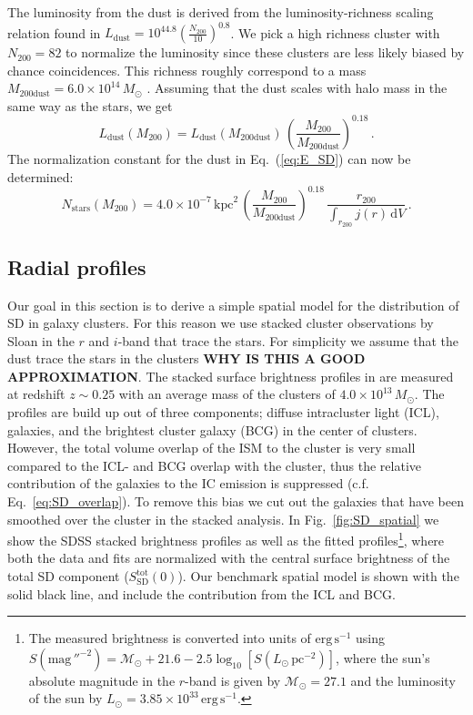 \documentclass[10pt,aps,pra,reprint,amsmath,amsfonts,amssymb,showpacs,nofootinbib,floatfix]{revtex4-1}
\newcommand{\rmn}{\mathrm}
\newcommand{\sd}{\rmn{SD}}
\newcommand{\msun}{M_\odot}
\newcommand{\stars}{\rmn{stars}}
\newcommand{\dust}{\rmn{dust}}
\newcommand{\kpc}{\rmn{kpc}}
\newcommand{\dd}{\rmn{d}}
\newcommand{\rvir}{r_{200}}
\newcommand{\mvir}{M_{200}}
\begin{document}
The luminosity from the dust is derived from the luminosity-richness
scaling relation found in \cite{2008A&A...490..547G}
$L_\dust=10^{44.8}\left(\frac{N_{200}}{10}\right)^{0.8}$. We pick a
high richness cluster with $N_{200}=82$ to normalize the luminosity
since these clusters are less likely biased by chance
coincidences. This richness roughly correspond to a mass
$M_\rmn{200dust}=6.0\times10^{14}\,\msun$
\cite{2010ApJ...713.1037H}. Assuming that the dust scales with halo
mass in the same way as the stars, we get
\begin{equation}
L_\dust(\mvir)=L_\dust(M_\rmn{200dust})\,
\left(\frac{\mvir}{M_\rmn{200dust}}\right)^{0.18}\,.
\label{eq:L_dust_scale}
\end{equation} 
The normalization constant for the dust in Eq.~(\ref{eq:E_SD}) can now
be determined:
\begin{equation}
 N_\stars(\mvir) = 4.0\times10^{-7}\,\kpc^2\,
\left(\frac{\mvir}{M_\rmn{200dust}}\right)^{0.18}\,
\frac{\rvir}{\int_{\rvir} j(r) \,\dd V}\,.
\label{eq:N_dust}
\end{equation}


\subsection{Radial profiles}
\label{sect:SD_radial}
Our goal in this section is to derive a simple spatial model for the
distribution of SD in galaxy clusters. For this reason we use stacked
cluster observations by Sloan in the $r$ and $i$-band that trace the
stars. For simplicity we assume that the dust trace the stars in the
clusters {\bf WHY IS THIS A GOOD APPROXIMATION}. The stacked surface
brightness profiles in \cite{2005MNRAS.358..949Z} are measured at
redshift $z \sim 0.25$ with an average mass of the clusters of
$4.0\times10^{13}\,\msun$. The profiles are build up out of three
components; diffuse intracluster light (ICL), galaxies, and the
brightest cluster galaxy (BCG) in the center of clusters. However, the
total volume overlap of the ISM to the cluster is very small compared
to the ICL- and BCG overlap with the cluster, thus the relative
contribution of the galaxies to the IC emission is suppressed
(c.f. Eq.~\ref{eq:SD_overlap}). To remove this bias we cut out the
galaxies that have been smoothed over the cluster in the stacked
analysis. In Fig.~\ref{fig:SD_spatial} we show the SDSS stacked
brightness profiles as well as the fitted profiles\footnote{The
  measured brightness is converted into units of
  $\rmn{erg}\,\rmn{s}^{-1}$ using \cite{2010...book}
  $S(\rmn{mag}\,''^{-2}) =
  \mathcal{M}_\odot+21.6-2.5\log_{10}[S(L_\odot\,\rmn{pc}^{-2})]$,
  where the sun's absolute magnitude in the $r$-band is given by
  $\mathcal{M}_\odot=27.1$ \cite{1998gaas.book.....B} and the
  luminosity of the sun by $L_\odot=3.85\times10^{33}\,
  \rmn{erg}\,\rmn{s}^{-1}$.}, where both the data and fits are
normalized with the central surface brightness of the total SD
component ($S_\sd^\rmn{tot}(0)$). Our benchmark spatial model is shown
with the solid black line, and include the contribution from the ICL
and BCG.
\end{document}
